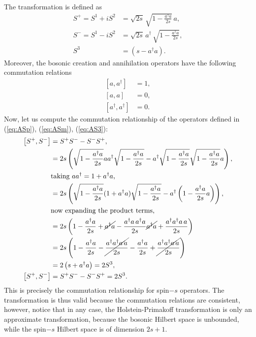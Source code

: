 \documentclass[a4paper]{report}
\begin{document}
\begin{spacing}{1.1}
\begin{appendices}
The transformation is defined as
\begin{align}
    S^+ = S^1 + iS^2 &= \sqrt{2s} \, \sqrt{1-\frac{a^\dagger a}{2s}} \, a, \label{eq:ASp}\\
    S^- = S^1 - iS^2 &= \sqrt{2s} \, a^\dagger \, \sqrt{1-\frac{a^\dagger a}{2s}}, \label{eq:ASm}\\
    S^3 &= (s-a^\dagger a) \label{eq:AS3}.
\end{align}
Moreover, the bosonic creation and annihilation operators have the following commutation relations
\begin{align}
    \left[ a , a^\dagger \right] &= 1, \\
    \left[ a , a \right] &= 0, \\
    \left[ a^\dagger , a^\dagger \right] &= 0.
\end{align}
Now, let us compute the commutation relationship of the operators defined in (\ref{eq:ASp}), (\ref{eq:ASm}), (\ref{eq:AS3}):
\begin{align*}
    \left[ S^+,S^- \right] &= S^+ S^- - S^- S^+, \\
    &= 2s \left( \sqrt{1-\frac{a^\dagger a}{2s}} a a^\dagger \sqrt{1-\frac{a^\dagger a}{2s}} - a^\dagger \sqrt{1-\frac{a^\dagger a}{2s}} \sqrt{1-\frac{a^\dagger a}{2s}} a \right),\\
    &\text{taking $a a^\dagger = 1 + a^\dagger a$,}\\
    &= 2s \left( \sqrt{1-\frac{a^\dagger a}{2s}} ( 1 + a^\dagger a) \sqrt{1-\frac{a^\dagger a}{2s}} - a^\dagger \left(1-\frac{a^\dagger a}{2s} a\right) \right),\\
    &\text{now expanding the product terms,}\\
    &= 2s\left( 1 - \frac{a^\dagger a}{2s} + \cancel{ a^\dagger a} - \frac{a^\dagger a\,a^\dagger a}{2s} \cancel{a^\dagger a} + \frac{a^\dagger a^\dagger a\,a}{2s}  \right)\\
    &= 2s\left( 1 - \frac{a^\dagger a}{2s} - \cancel{\frac{a^\dagger a^\dagger a\,a}{2s}} - \frac{a^\dagger a}{2s} + \cancel{\frac{a^\dagger a^\dagger a\,a}{2s} } \right)\\
    &= 2\left(s + a^\dagger a\right) = 2S^3,\\
    \left[ S^+,S^- \right] &= S^+ S^- - S^- S^+ = 2S^3.
\end{align*}
This is precisely the commutation relationship for spin$-s$ operators. The transformation is thus valid because the commutation relations are consistent, however, notice that in any case, the Holstein-Primakoff transformation is only an approximate transformation, because the bosonic Hilbert space is unbounded, while the spin$-s$ Hilbert space is of dimension $2s+1$.





\end{appendices}
\end{spacing}
\end{document}
